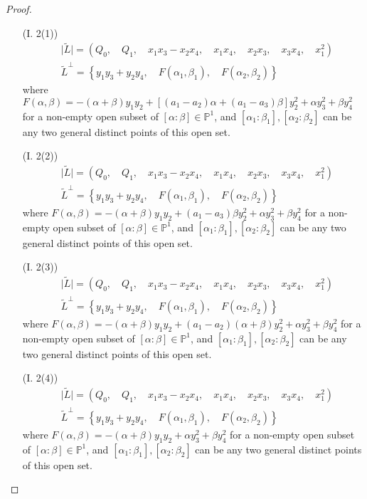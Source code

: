 \documentclass{amsart}[12pt]
\theoremstyle{definition}
\theoremstyle{remark}
\numberwithin{equation}{section}
\newcommand{\abs}[1]{\lvert#1\rvert}
\begin{document}
\begin{proof}
\begin{enumerate}
\item[(I. 2(1))]
\begin{align*}
& \abs{\tilde{L}} = (Q_0, \quad Q_1, \quad x_1x_3 - x_2x_4, \quad x_1x_4, \quad x_2x_3, \quad x_3x_4, \quad x_1^2) \\ 
& \tilde{L}^{\perp} = \left\{y_1y_3 + y_2y_4, \quad F(\alpha_1, \beta_1), \quad F(\alpha_2, \beta_2) \right\}
\end{align*} 
where $F(\alpha, \beta) = -(\alpha + \beta) y_1y_2 + [(a_1 - a_2)\alpha +(a_1 - a_3)\beta] y_2^2 + \alpha y_3^2 + \beta y_4^2$ for a non-empty open subset of $[\alpha: \beta] \in \mathbb{P}^1$, and $[\alpha_1: \beta_1], [\alpha_2: \beta_2]$ can be any two general distinct points of this open set. 

\item[(I. 2(2))]
\begin{align*}
& \abs{\tilde{L}} = (Q_0, \quad Q_1, \quad x_1x_3 - x_2x_4, \quad x_1x_4, \quad x_2x_3, \quad x_3x_4, \quad x_1^2) \\ 
& \tilde{L}^{\perp} = \left\{y_1y_3 + y_2y_4, \quad F(\alpha_1, \beta_1), \quad F(\alpha_2, \beta_2) \right\}
\end{align*} 
where $F(\alpha, \beta) = -(\alpha + \beta) y_1y_2 + (a_1 - a_3)\beta y_2^2 + \alpha y_3^2 + \beta y_4^2$ for a non-empty open subset of $[\alpha: \beta] \in \mathbb{P}^1$, and $[\alpha_1: \beta_1], [\alpha_2: \beta_2]$ can be any two general distinct points of this open set. 

\item[(I. 2(3))]
\begin{align*}
& \abs{\tilde{L}} = (Q_0, \quad Q_1, \quad x_1x_3 - x_2x_4, \quad x_1x_4, \quad x_2x_3, \quad x_3x_4, \quad x_1^2) \\ 
& \tilde{L}^{\perp} = \left\{y_1y_3 + y_2y_4, \quad F(\alpha_1, \beta_1), \quad F(\alpha_2, \beta_2) \right\}
\end{align*} 
where $F(\alpha, \beta) = -(\alpha + \beta) y_1y_2 + (a_1 - a_2)(\alpha + \beta) y_2^2 + \alpha y_3^2 + \beta y_4^2$ for a non-empty open subset of $[\alpha: \beta] \in \mathbb{P}^1$, and $[\alpha_1: \beta_1], [\alpha_2: \beta_2]$ can be any two general distinct points of this open set. 

\item[(I. 2(4))]
\begin{align*}
& \abs{\tilde{L}} = (Q_0, \quad Q_1, \quad x_1x_3 - x_2x_4, \quad x_1x_4, \quad x_2x_3, \quad x_3x_4, \quad x_1^2) \\ 
& \tilde{L}^{\perp} = \left\{y_1y_3 + y_2y_4, \quad F(\alpha_1, \beta_1), \quad F(\alpha_2, \beta_2) \right\}
\end{align*} 
where $F(\alpha, \beta) = -(\alpha + \beta) y_1y_2 + \alpha y_3^2 + \beta y_4^2$ for a non-empty open subset of $[\alpha: \beta] \in \mathbb{P}^1$, and $[\alpha_1: \beta_1], [\alpha_2: \beta_2]$ can be any two general distinct points of this open set. 


\end{enumerate}
\end{proof}
\end{document}
